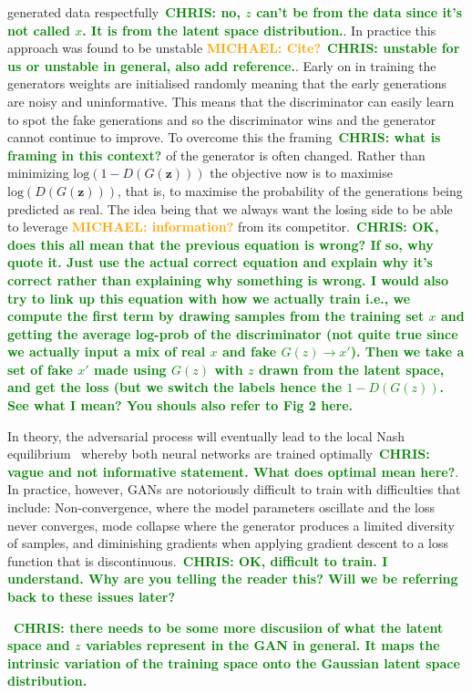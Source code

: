 \documentclass[12pt]{iopart}
\newcommand{\chris}[1]{\textbf{\textcolor{green}{CHRIS: #1}}}
\newcommand{\michael}[1]{\textbf{\textcolor{orange}{MICHAEL: #1}}}
\begin{document}
generated data respectfully~\chris{no, $z$ can't be from the data since it's
not called $x$. It is from the latent space distribution.}. In practice this
approach was found to be unstable \michael{Cite?}~\chris{unstable for us or
unstable in general, also add reference.}. Early on in training the generators
weights are initialised randomly meaning that the early generations are noisy
and uninformative. This means that the discriminator can easily learn to spot
the fake generations and so the discriminator wins and the generator cannot
continue to improve. To overcome this the framing~\chris{what is framing in
this context?} of the generator is often changed. Rather than minimizing
$\text{log}(1-D(G(\mathbf{z})))$ the objective now is to maximise
$\text{log}(D(G(\mathbf{z})))$, that is, to maximise the probability of the
generations being predicted as real. The idea being that we always want the
losing side to be able to leverage \michael{information?} from its
competitor.~\chris{OK, does this all mean that the previous equation is wrong?
If so, why quote it. Just use the actual correct equation and explain why it's
correct rather than explaining why something is wrong. I would also try to link
up this equation with how we actually train i.e., we compute the first term by
drawing samples from the training set $x$ and getting the average log-prob of
the discriminator (not quite true since we actually input a mix of real $x$ and
fake $G(z)\rightarrow x'$). Then we take a set of fake $x'$ made using $G(z)$
with $z$ drawn from the latent space, and get the loss (but we switch the
labels hence the $1-D(G(z))$. See what I mean? You shouls also refer to Fig 2
here.} 
%

%
In theory, the adversarial process will eventually lead to the local Nash
equilibrium~\cite{Nash1950} whereby both neural networks are trained
optimally~\chris{vague and not informative statement. What does optimal mean
here?}. In practice, however, \acp{GAN} are notoriously difficult to train with
difficulties that include: Non-convergence, where the model parameters
oscillate and the loss never converges, mode collapse where the generator
produces a limited diversity of samples, and diminishing gradients when
applying gradient descent to a loss function that is discontinuous.~\chris{OK,
difficult to train. I understand. Why are you telling the reader this? Will we
be referring back to these issues later?}

~\chris{there needs to be some more discusiion of what the latent space
and $z$ variables represent in the GAN in general. It maps the intrinsic
variation of the training space onto the Gaussian latent space distribution.}
\end{document}
